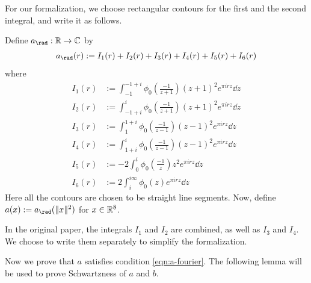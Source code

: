 For our formalization, we choose rectangular contours for the first and the second integral, and write it as follows.
\begin{definition}\label{def:a-definition}\leanok
{}
Define $a_{\rad} : \R \to \C$ by
\begin{align}\label{eqn:a-rad-definition}
    a_\rad(r) := I_1(r) + I_2(r) + I_3(r) + I_4(r) + I_5(r) + I_6(r)
\end{align}
where
\begin{align}
    I_1(r) &:= \int_{-1}^{-1 + i} \phi_0 \left(\frac{-1}{z+1}\right) (z + 1)^2 e^{\pi i r z} \dd z \label{eqn:a-I1} \\
    I_2(r) &:= \int_{-1 + i}^{i} \phi_0 \left(\frac{-1}{z+1}\right) (z + 1)^2 e^{\pi i r z} \dd z \label{eqn:a-I2} \\
    I_3(r) &:= \int_{1}^{1 + i} \phi_0 \left(\frac{-1}{z-1}\right) (z - 1)^2 e^{\pi i r z} \dd z \label{eqn:a-I3} \\
    I_4(r) &:= \int_{1 + i}^{i} \phi_0 \left(\frac{-1}{z-1}\right) (z - 1)^2 e^{\pi i r z} \dd z \label{eqn:a-I4} \\
    I_5(r) &:= -2 \int_{0}^{i} \phi_0 \left(\frac{-1}{z}\right) z^2 e^{\pi i r z} \dd z \label{eqn:a-I5} \\
    I_6(r) &:= 2 \int_{i}^{i\infty} \phi_0(z) e^{\pi i r z} \dd z \label{eqn:a-I6}
\end{align}
Here all the contours are chosen to be straight line segments.
Now, define $a(x) := a_{\rad}(\|x\|^2)$ for $x \in \mathbb{R}^8$.
\end{definition}
In the original paper, the integrals $I_1$ and $I_2$ are combined, as well as $I_3$ and $I_4$.
We choose to write them separately to simplify the formalization.

Now we prove that $a$ satisfies condition \eqref{eqn:a-fourier}.
The following lemma will be used to prove Schwartzness of $a$ and $b$.


